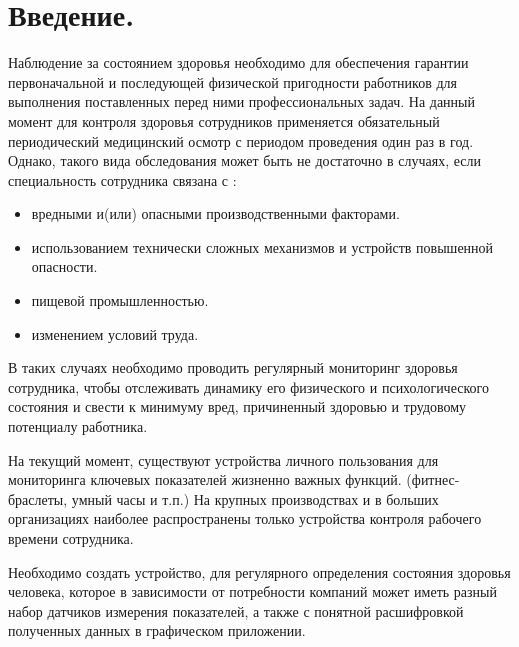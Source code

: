 \documentclass[a4document]{article}
\begin{document}
{
\newpage
\section*{Введение.} 

\par
Наблюдение за состоянием здоровья необходимо для обеспечения гарантии первоначальной и последующей физической пригодности работников для выполнения поставленных перед ними профессиональных задач. На данный момент для контроля здоровья сотрудников применяется обязательный периодический медицинский осмотр с периодом проведения один раз в год. Однако, такого вида обследования может быть не достаточно в случаях, если специальность сотрудника связана с : 

\begin{itemize}
    \item вредными и(или) опасными производственными факторами.
    \item использованием технически сложных механизмов и устройств повышенной опасности.
    \item пищевой промышленностью.
    \item изменением условий труда.
\end{itemize} 

\par\noindent 
В таких случаях необходимо проводить регулярный мониторинг здоровья сотрудника, чтобы отслеживать динамику его физического и психологического состояния и свести к минимуму вред, причиненный здоровью и трудовому потенциалу работника.

\par\noindent
На текущий момент, существуют устройства личного пользования для мониторинга ключевых показателей жизненно важных функций. 
(фитнес-браслеты, умный часы и т.п.) На крупных производствах и в больших организациях наиболее распространены 
только устройства контроля рабочего времени сотрудника.

\par\noindent
Необходимо создать устройство, для регулярного определения состояния здоровья человека, 
которое в зависимости от потребности компаний может иметь разный набор датчиков измерения показателей,
а также с понятной расшифровкой полученных данных в графическом приложении. 

}
\end{document}
